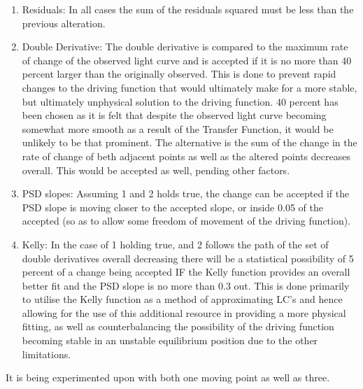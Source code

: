 \documentclass[a4paper, 12pt, twoside]{article}
\begin{document}
\begin{enumerate}
\item Residuals: In all cases the sum of the residuals squared must be less than the previous alteration.
\item Double Derivative: The double derivative is compared to the maximum rate of change of the observed light curve and is accepted if it is no more than 40 percent larger than the originally observed. This is done to prevent rapid changes to the driving function that would ultimately make for a more stable, but ultimately unphysical solution to the driving function. 40 percent has been chosen as it is felt that despite the observed light curve becoming somewhat more smooth as a result of the Transfer Function, it would be unlikely to be that prominent. The alternative is the sum of the change in the rate of change of beth adjacent points as well as the altered points decreases overall. This would be accepted as well, pending other factors.
\item PSD slopes: Assuming 1 and 2 holds true, the change can be accepted if the PSD slope is moving closer to the accepted slope, or inside 0.05 of the accepted (so as to allow some freedom of movement of the driving function).
\item Kelly: In the case of 1 holding true, and 2 follows the path of the set of double derivatives overall decreasing there will be a statistical possibility of 5 percent of a change being accepted IF the Kelly function provides an overall better fit and the PSD slope is no more than 0.3 out. This is done primarily to utilise the Kelly function as a method of approximating LC's and hence allowing for the use of this additional resource in providing a more physical fitting, as well as counterbalancing the possibility of the driving function becoming stable in an unstable equilibrium position due to the other limitations.
\end{enumerate}
It is being experimented upon with both one moving point as well as three. 
\end{document}
